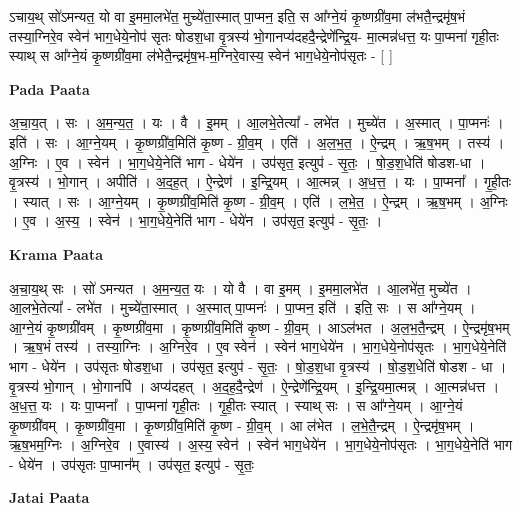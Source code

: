 \documentclass[17pt]{extarticle}
\begin{document}
ऽचाय॒थ् सो॑ऽमन्यत॒ यो वा इ॒ममा॒लभे॑त॒ मुच्ये॑ता॒स्मात् पा॒प्मन॒ इति॒ स आ᳚ग्ने॒यं कृ॒ष्णग्री॑व॒मा ल॑भतै॒न्द्रमृ॑ष॒भं तस्या॒ग्निरे॒व स्वेन॑ भाग॒धेये॒नोप॑ सृतः षोडश॒धा वृ॒त्रस्य॑ भो॒गानप्य॑दहदै॒न्द्रेणे᳚न्द्रि॒य- मा॒त्मन्न॑धत्त॒ यः पा॒प्मना॑ गृही॒तः स्याथ् स आ᳚ग्ने॒यं कृ॒ष्णग्री॑व॒मा ल॑भेतै॒न्द्रमृ॑ष॒भ-म॒ग्निरे॒वास्य॒ स्वेन॑ भाग॒धेये॒नोप॑सृतः - [  ] \newline

\textbf{Pada Paata} \newline

अ॒चा॒य॒त् । सः । अ॒म॒न्य॒त॒ । यः । वै । इ॒मम् । आ॒लभे॒तेत्या᳚ - लभे॑त । मुच्ये॑त । अ॒स्मात् । पा॒प्मनः॑ । इति॑ । सः । आ॒ग्ने॒यम् । कृ॒ष्णग्री॑व॒मिति॑ कृ॒ष्ण - ग्री॒व॒म् । एति॑ । अ॒ल॒भ॒त॒ । ऐ॒न्द्रम् । ऋ॒ष॒भम् । तस्य॑ । अ॒ग्निः । ए॒व । स्वेन॑ । भा॒ग॒धेये॒नेति॑ भाग - धेये॑न । उप॑सृत॒ इत्युप॑ - सृ॒तः॒ । षो॒ड॒श॒धेति॑ षोडश-धा । वृ॒त्रस्य॑ । भो॒गान् । अपीति॑ । अ॒द॒ह॒त् । ऐ॒न्द्रेण॑ । इ॒न्द्रि॒यम् । आ॒त्मन्न् । अ॒ध॒त्त॒ । यः । पा॒प्मना᳚ । गृ॒ही॒तः । स्यात् । सः । आ॒ग्ने॒यम् । कृ॒ष्णग्री॑व॒मिति॑ कृ॒ष्ण - ग्री॒व॒म् । एति॑ । ल॒भे॒त॒ । ऐ॒न्द्रम् । ऋ॒ष॒भम् । अ॒ग्निः । ए॒व । अ॒स्य॒ । स्वेन॑ । भा॒ग॒धेये॒नेति॑ भाग - धेये॑न । उप॑सृत॒ इत्युप॑ - सृ॒तः॒ ।  \newline


\textbf{Krama Paata} \newline

अ॒चा॒य॒थ् सः । सो॑ ऽमन्यत । अ॒म॒न्य॒त॒ यः । यो वै । वा इ॒मम् । इ॒ममा॒लभे॑त । आ॒लभे॑त॒ मुच्ये॑त । आ॒लभे॒तेत्या᳚ - लभे॑त । मुच्ये॑ता॒स्मात् । अ॒स्मात् पा॒प्मनः॑ । पा॒प्मन॒ इति॑ । इति॒ सः । स आ᳚ग्ने॒यम् । आ॒ग्ने॒यं कृ॒ष्णग्री॑वम् । कृ॒ष्णग्री॑व॒मा । कृ॒ष्णग्री॑व॒मिति॑ कृ॒ष्ण - ग्री॒व॒म् । आऽल॑भत । अ॒ल॒भ॒तै॒न्द्रम् । ऐ॒न्द्रमृ॑ष॒भम् । ऋ॒ष॒भं तस्य॑ । तस्या॒ग्निः । अ॒ग्निरे॒व । ए॒व स्वेन॑ । स्वेन॑ भाग॒धेये॑न । भा॒ग॒धेये॒नोप॑सृतः । भा॒ग॒धेये॒नेति॑ भाग - धेये॑न । उप॑सृतः षोडश॒धा । उप॑सृत॒ इत्युप॑ - सृ॒तः॒ । षो॒ड॒श॒धा वृ॒त्रस्य॑ । षो॒ड॒श॒धेति॑ षोडश - धा । वृ॒त्रस्य॑ भो॒गान् । भो॒गानपि॑ । अप्य॑दहत् । अ॒द॒ह॒दै॒न्द्रेण॑ । ऐ॒न्द्रेणे᳚न्द्रि॒यम् । इ॒न्द्रि॒यमा॒त्मन्न् । आ॒त्मन्न॑धत्त । अ॒ध॒त्त॒ यः । यः पा॒प्मना᳚ । पा॒प्मना॑ गृही॒तः । गृ॒ही॒तः स्यात् । स्याथ् सः । स आ᳚ग्ने॒यम् । आ॒ग्ने॒यं कृ॒ष्णग्री॑वम् । कृ॒ष्णग्री॑व॒मा । कृ॒ष्णग्री॑व॒मिति॑ कृ॒ष्ण - ग्री॒व॒म् । आ ल॑भेत । ल॒भे॒तै॒न्द्रम् । ऐ॒न्द्रमृ॑ष॒भम् । ऋ॒ष॒भम॒ग्निः । अ॒ग्निरे॒व । ए॒वास्य॑ । अ॒स्य॒ स्वेन॑ । स्वेन॑ भाग॒धेये॑न । भा॒ग॒धेये॒नोप॑सृतः । भा॒ग॒धेये॒नेति॑ भाग - धेये॑न । उप॑सृतः पा॒प्मान᳚म् । उप॑सृत॒ इत्युप॑ - सृ॒तः॒ \newline

\textbf{Jatai Paata} \newline
\end{document}
